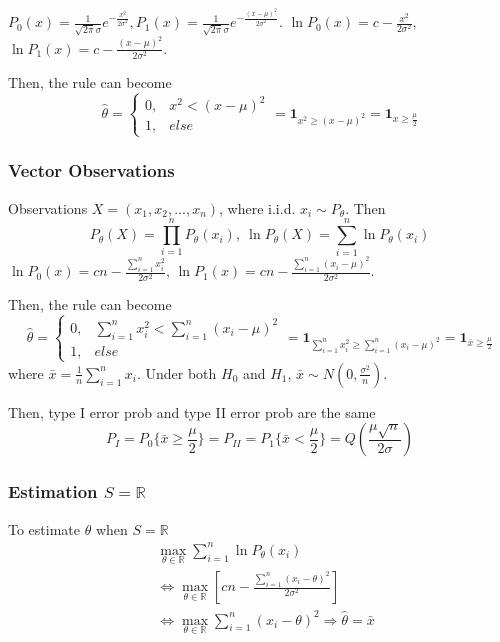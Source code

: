 \documentclass[11pt,a4paper]{article}
\begin{document}
$P_0(x)=\frac{1}{\sqrt{2\pi}\sigma}e^{-\frac{x^2}{2\sigma^2}}, P_1(x)=\frac{1}{\sqrt{2\pi}\sigma}e^{-\frac{(x-\mu)^2}{2\sigma^2}}$. $\ln P_0(x)=c-\frac{x^2}{2\sigma^2}$, $\ln P_1(x)=c-\frac{(x-\mu)^2}{2\sigma^2}$.

Then, the rule can become $$\hat{\theta}=\left\{\begin{matrix}
    0,&x^2<(x-\mu)^2\\
    1,&else
\end{matrix}\right.=\mathbf{1}_{x^2\geq (x-\mu)^2}=\mathbf{1}_{x\geq \frac{\mu}{2}}$$

\subsubsection*{Vector Observations}
Observations $X=\left(x_1,x_2,...,x_n\right)$, where i.i.d. $x_i\sim P_\theta$. Then $$P_\theta(X)=\prod_{i=1}^n P_\theta(x_i),\ \ln P_\theta(X)=\sum_{i=1}^n\ln P_\theta(x_i)$$
$\ln P_0(x)=cn-\frac{\sum_{i=1}^n x_i^2}{2\sigma^2}$, $\ln P_1(x)=cn-\frac{\sum_{i=1}^n(x_i-\mu)^2}{2\sigma^2}$.

Then, the rule can become $$\hat{\theta}=\left\{\begin{matrix}
    0,&\sum_{i=1}^nx_i^2<\sum_{i=1}^n(x_i-\mu)^2\\
    1,&else
\end{matrix}\right.=\mathbf{1}_{\sum_{i=1}^nx_i^2\geq \sum_{i=1}^n(x_i-\mu)^2}=\mathbf{1}_{\bar{x}\geq \frac{\mu}{2}}$$
where $\bar{x}=\frac{1}{n}\sum_{i=1}^nx_i$. Under both $H_0$ and $H_1$, $\bar{x}\sim N(0,\frac{\sigma^2}{n})$.

Then, type I error prob and type II error prob are the same $$P_I=P_0\{\bar{x}\geq \frac{\mu}{2}\}=P_{II}=P_1\{\bar{x}< \frac{\mu}{2}\}=Q\left(\frac{\mu\sqrt{n}}{2\sigma}\right)$$

\subsubsection*{Estimation $S=\mathbb{R}$}
To estimate $\theta$ when $S=\mathbb{R}$
\begin{equation}
    \begin{aligned}
        &\max_{\theta\in \mathbb{R}}\sum_{i=1}^n\ln P_\theta(x_i)\\
        &\Leftrightarrow \max_{\theta\in \mathbb{R}} \left[cn-\frac{\sum_{i=1}^n(x_i-\theta)^2}{2\sigma^2}\right]\\
        &\Leftrightarrow \max_{\theta\in \mathbb{R}} \sum_{i=1}^n(x_i-\theta)^2 \Rightarrow \hat{\theta}=\bar{x}
    \end{aligned}
    \nonumber
\end{equation}
\end{document}

